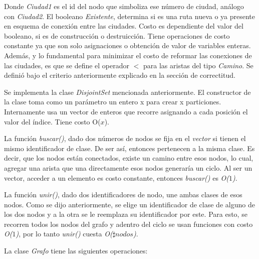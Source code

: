 \quad 

\quad Donde \textit{Ciudad1} es el id del nodo que simboliza ese n\'umero de ciudad, an\'alogo con \textit{Ciudad2}. El booleano \textit{Existente}, determina si es una ruta nueva o ya presente en esquema de conexi\'on entre las ciudades. Costo es dependiente del valor del booleano, si es de construcci\'on o destruicci\'on. Tiene operaciones de costo constante ya que son solo asignaciones o obtenci\'on de valor de variables enteras. Adem\'as, y lo fundamental para minimizar el costo de reformar las conexiones de las ciudades, es que se define el operador $ < $ para las aristas del tipo \textit{Camino}. Se defini\'o bajo el criterio anteriormente explicado en la secci\'on de correctitud.

\quad

\quad Se implementa la clase \textit{DisjointSet} mencionada anteriormente. El constructor de la clase toma como un par\'ametro un entero x para crear x particiones. Internamente usa un vector de enteros que recorre asignando a cada posici\'on el valor del \'indice. Tiene costo O($ x $).

\quad La funci\'on \textit{buscar()}, dado dos n\'umeros de nodos se fija en el \textit{vector} si tienen el mismo identificador de clase. De ser as\'i, entonces pertenecen a la misma clase. Es decir, que los nodos est\'an conectados, existe un camino entre esos nodos, lo cual, agregar una arista que una 
directamente esos nodos generar\'ia un ciclo. Al ser un vector, acceder a un elemento es costo constante, entonces \textit{buscar()} es \textit{O($ 1 $)}.

\quad La funci\'on \textit{unir()}, dado dos identificadores de nodo, une ambas clases de esos nodos. Como se dijo anteriormente, se elige un identificador de clase de alguno de los dos nodos y a la otra se le reemplaza su identificador por este. Para esto, se recorren todos los nodos del grafo y adentro del ciclo se usan funciones con costo \textit{O($ 1 $)}, por lo tanto \textit{unir()} cuesta \textit{O($ \sharp nodos $)}. 

\quad

\quad La clase \textit{Grafo} tiene las siguientes operaciones:

